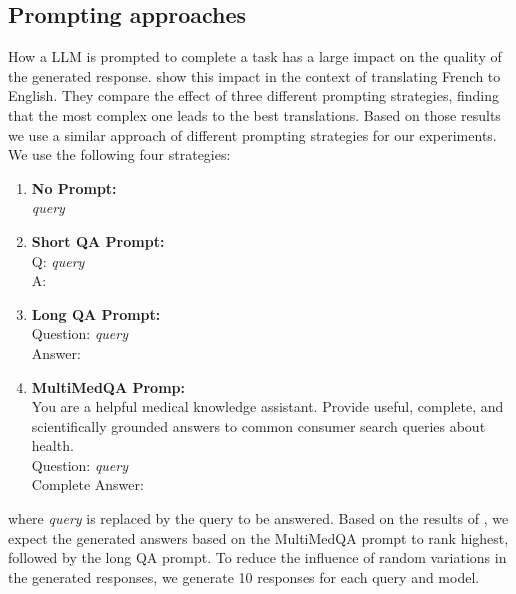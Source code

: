 \subsection{Prompting approaches}\label{sec:prompting-approaches}
How a LLM is prompted to complete a task has a large impact on the quality of the generated response.
\cite{reynolds:2021:Prompt} show this impact in the context of translating French to English.
They compare the effect of three different prompting strategies, finding that the most complex one leads to the best translations.
Based on those results we use a similar approach of different prompting strategies for our experiments.
We use the following four strategies:
\begin{enumerate}
    \item \textbf{No Prompt:}\\ \textit{query}
    \item \textbf{Short QA Prompt:}\\ Q: \textit{query}\\A:
    \item \textbf{Long QA Prompt:}\\ Question: \textit{query}\\Answer:
    \item \textbf{MultiMedQA Promp:}\\ You are a helpful medical knowledge assistant. Provide useful, complete, and scientifically grounded answers to common consumer search queries about health.\\Question: \textit{query}\\Complete Answer:
\end{enumerate}
where \textit{query} is replaced by the query to be answered.
Based on the results of \cite{reynolds:2021:Prompt}, we expect the generated answers based on the MultiMedQA prompt to rank highest, followed by the long QA prompt.
To reduce the influence of random variations in the generated responses, we generate 10 responses for each query and model.

